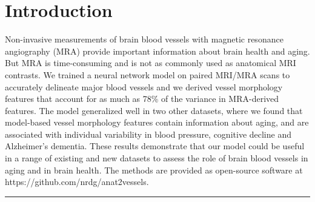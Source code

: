 \documentclass[a0, portrait]{a0poster}
\begin{document}
\vspace*{-1cm}
\section*{Introduction}
\vspace*{-0.5cm}
Non-invasive measurements of brain blood vessels with magnetic
resonance angiography (MRA) provide important information about brain health
and aging. But MRA is time-consuming and is not as commonly used as anatomical
MRI contrasts. We trained a neural network model on paired MRI/MRA scans to
accurately delineate major blood vessels and we derived vessel morphology
features that account for as much as 78\% of the variance in MRA-derived
features. The model generalized well in two other datasets, where we found that
model-based vessel morphology features contain information about aging, and are
associated with individual variability in blood pressure, cognitive decline and
Alzheimer's dementia. These results demonstrate that our model could be useful
in a range of existing and new datasets to assess the role of brain blood
vessels in aging and in brain health. The methods are provided as open-source
software at https://github.com/nrdg/anat2vessels.

\rule{\linewidth}{2pt}
\end{document}
